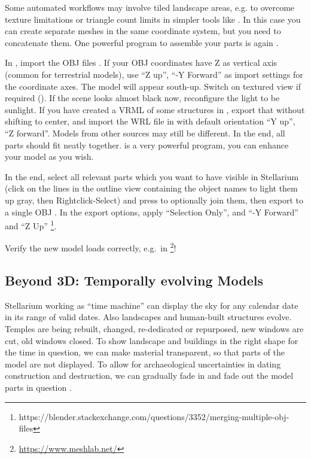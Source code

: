 Some automated workflows may involve tiled landscape areas, e.g. to
overcome texture limitations or triangle count limits in simpler tools
like . In this case you can create separate meshes
in the same coordinate system, but you need to concatenate them. One
powerful program to assemble your parts is again .

In , import the OBJ files . If your OBJ coordinates have Z as vertical axis (common for
terrestrial models), use ``Z up'', ``-Y Forward'' as import settings
for the coordinate axes. The model will appear south-up.  Switch on
textured view if required (). If the scene looks almost
black now, reconfigure the light to be sunlight. If you have created a
VRML of some structures in , export that without
shifting to center, and import the WRL file in  with
default orientation ``Y up'', ``Z forward''. Models from other sources
may still be different. In the end, all parts should fit neatly
together.  is a very powerful program, you can
enhance your model as you wish.

In the end, select all relevant parts which you want to have visible
in Stellarium (click on the lines in the outline view containing the
object names to light them up gray, then Rightclick-Select) and press
 to optionally join them, then export to a single OBJ
. In the export options, apply
``Selection Only'', and ``-Y Forward'' and ``Z Up''%
\footnote{https://blender.stackexchange.com/questions/3352/merging-multiple-obj-files}.

Verify the new model loads correctly, e.g.\ in \footnote{\url{https://www.meshlab.net/}}!

\subsection{Beyond 3D: Temporally evolving Models}
\label{sec:scenery3d:Beyond3D}

Stellarium  working as ``time machine'' can display the sky for any calendar date in its range of valid dates. 
Also landscapes and human-built structures evolve. Temples are being rebuilt, changed, re-dedicated or repurposed, 
new windows are cut, old windows closed. 
To show landscape and buildings in the right shape for the time in question, we can make material transparent, 
so that parts of the model are not displayed.  To allow for archaeological uncertainties in dating 
construction and destruction, we can gradually fade in and fade out the model parts in question \citep{Zotti:SEAC2017}.

